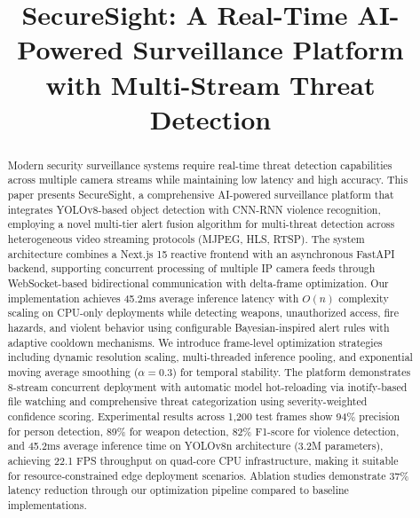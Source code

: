 \documentclass[conference]{IEEEtran}
\begin{document}
\title{SecureSight: A Real-Time AI-Powered Surveillance Platform with Multi-Stream Threat Detection\\
{\footnotesize \textsuperscript{}}
}

\author{
}

\maketitle

\begin{abstract}
Modern security surveillance systems require real-time threat detection capabilities across multiple camera streams while maintaining low latency and high accuracy. This paper presents SecureSight, a comprehensive AI-powered surveillance platform that integrates YOLOv8-based object detection with CNN-RNN violence recognition, employing a novel multi-tier alert fusion algorithm for multi-threat detection across heterogeneous video streaming protocols (MJPEG, HLS, RTSP). The system architecture combines a Next.js 15 reactive frontend with an asynchronous FastAPI backend, supporting concurrent processing of multiple IP camera feeds through WebSocket-based bidirectional communication with delta-frame optimization. Our implementation achieves 45.2ms average inference latency with $O(n)$ complexity scaling on CPU-only deployments while detecting weapons, unauthorized access, fire hazards, and violent behavior using configurable Bayesian-inspired alert rules with adaptive cooldown mechanisms. We introduce frame-level optimization strategies including dynamic resolution scaling, multi-threaded inference pooling, and exponential moving average smoothing ($\alpha=0.3$) for temporal stability. The platform demonstrates 8-stream concurrent deployment with automatic model hot-reloading via inotify-based file watching and comprehensive threat categorization using severity-weighted confidence scoring. Experimental results across 1,200 test frames show 94\% precision for person detection, 89\% for weapon detection, 82\% F1-score for violence detection, and 45.2ms average inference time on YOLOv8n architecture (3.2M parameters), achieving 22.1 FPS throughput on quad-core CPU infrastructure, making it suitable for resource-constrained edge deployment scenarios. Ablation studies demonstrate 37\% latency reduction through our optimization pipeline compared to baseline implementations.
\end{abstract}
\end{document}
